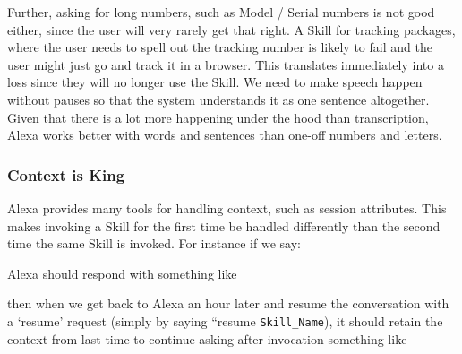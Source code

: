 Further, asking for long numbers, such as Model / Serial numbers is not good either, since the user will very rarely get that right. A Skill for tracking packages, where the user needs to spell out the tracking number is likely to fail and the user might just go and track it in a browser. This translates immediately into a loss since they will no longer use the Skill. We need to make speech happen without pauses so that the system understands it as one sentence altogether. Given that there is a lot more happening under the hood than transcription, Alexa works better with words and sentences than one-off numbers and letters. 

\subsubsection*{Context is King}
Alexa provides many tools for handling context, such as session attributes. This makes invoking a Skill for the first time be handled differently than the second time the same Skill is invoked. For instance if we say:




\noindent Alexa should respond with something like

\begin{flushright}
\end{flushright}



\noindent then when we get back to Alexa an hour later and resume the conversation with a `resume' request (simply by saying ``resume \texttt{Skill_Name}), it should retain the context from last time to continue asking after invocation something like

